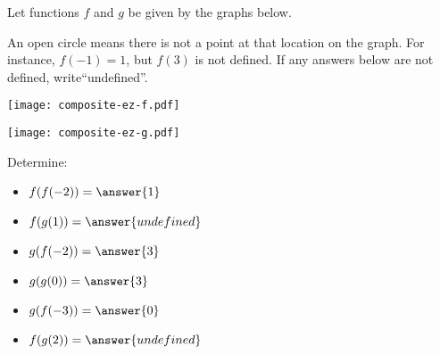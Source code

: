 \documentclass{ximera}
\author{Elizabeth Miller}
\begin{document}
\licenseAPC
\begin{exercise}

Let functions $f$ and $g$ be given by the graphs below. 

An open circle means there is not a point at that location on the
graph.  For instance, $f(-1) = 1$, but $f(3)$ is not defined.  If any
answers below are not defined, write``undefined''.

\begin{image}
\texttt{[image: composite-ez-f.pdf]}
\end{image}

\begin{image}
\texttt{[image: composite-ez-g.pdf]}
\end{image}

Determine:
\begin{itemize}
\item  $f(f(-2))=\answer{1}$
\item $f(g(1))=\answer{undefined}$ 
\item $g(f(-2))=\answer{3}$
\item   $g(g(0))=\answer{3}$
\item  $g(f(-3))=\answer{0}$
\item $f(g(2))=\answer{undefined}$ 
\end{itemize}




\end{exercise}
\end{document}

